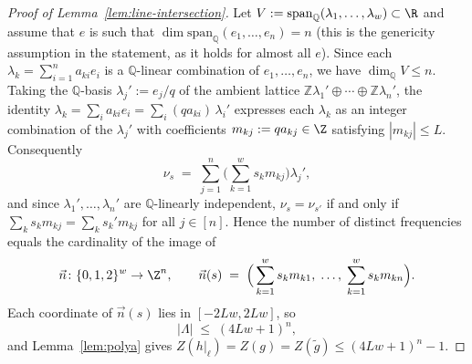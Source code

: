 \begin{proof}[Proof of Lemma~\ref{lem:line-intersection}]
Let $V := \mathrm{span}_{\mathbb{Q}}(\lambda_1,\ldots,\lambda_w) \subset \R$ and assume that $e$ is such that $\dim \mathrm{span}_{\mathbb{Q}}(e_1,\ldots,e_n) = n$ (this is the genericity assumption in the statement, as it holds for almost all $e$). Since each $\lambda_k = \sum_{i=1}^n a_{ki} e_i$ is a $\mathbb{Q}$-linear combination of $e_1,\ldots,e_n$, we have $\dim_\mathbb{Q} V \leq n$. Taking the $\mathbb{Q}$-basis $\lambda_j' := e_j/q$ of the ambient lattice $\mathbb{Z}\lambda_1'\oplus\cdots\oplus\mathbb{Z}\lambda_n'$, the identity $\lambda_k = \sum_i a_{ki}e_i = \sum_i (q a_{ki})\,\lambda_i'$ expresses each $\lambda_k$ as an integer combination of the $\lambda_j'$ with coefficients $m_{kj} := q a_{kj}\in \Z$ satisfying $|m_{kj}|\leq L$. Consequently
\begin{equation*}
  \nu_{s} \;=\; \sum_{j=1}^n \Big(\sum_{k=1}^w s_k m_{kj}\Big)\lambda_j',
\end{equation*}
and since $\lambda_1',\ldots,\lambda_n'$ are $\mathbb{Q}$-linearly independent, $\nu_{s} = \nu_{s'}$ if and only if $\sum_k s_k m_{kj} = \sum_k s_k' m_{kj}$ for all $j\in [n]$. Hence the number of distinct frequencies equals the cardinality of the image of
\begin{equation}\label{eq:freq-lattice-map}
  \vec n\colon \{0,1,2\}^w \to \Z^n, \qquad \vec n(s) \;=\; \Big(\sum_{k=1}^w s_k m_{k1},\; \ldots,\; \sum_{k=1}^w s_k m_{kn}\Big).
\end{equation}
Each coordinate of $\vec n(s)$ lies in $[-2Lw, 2Lw]$, so
\begin{equation*}
  |\Lambda| \;\leq\; (4Lw+1)^n,
\end{equation*}
and Lemma~\ref{lem:polya} gives $Z(h|_\ell) = Z(g) = Z(\widetilde{g}) \leq (4Lw+1)^n - 1$.
\end{proof}


